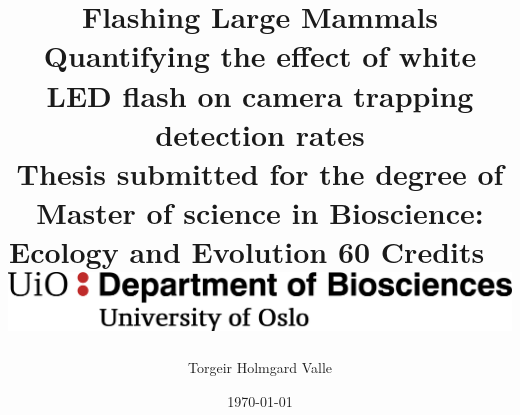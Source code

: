 \title{	
	{\large Flashing Large Mammals}\\
	{\small Quantifying the effect of white LED flash on camera trapping detection rates}\\
	{Thesis submitted for the degree of Master of science in Bioscience:
	Ecology and Evolution 60 Credits 
}
	{~}\\
	{\includegraphics[scale=0.5]{img/MN_IMBV_A_ENG.png} }\\
}
\author{Torgeir Holmgard Valle}
\date{\today}